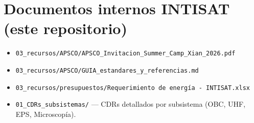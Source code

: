 \section*{Documentos internos INTISAT (este repositorio)}
\begin{itemize}
    \item \texttt{03\_recursos/APSCO/APSCO\_Invitacion\_Summer\_Camp\_Xian\_2026.pdf}
    \item \texttt{03\_recursos/APSCO/GUIA\_estandares\_y\_referencias.md}
    \item \texttt{03\_recursos/presupuestos/Requerimiento de energía - INTISAT.xlsx}
    \item \texttt{01\_CDRs\_subsistemas/} — CDRs detallados por subsistema (OBC, UHF, EPS, Microscopía).
\end{itemize}
